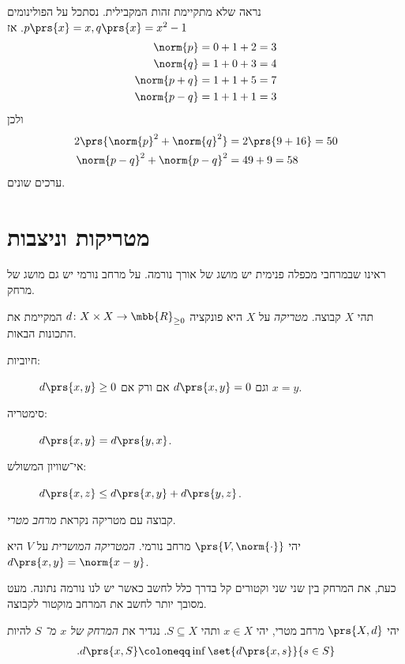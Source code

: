 \documentclass[a4paper,10pt,twoside,openany]{book}
\begin{document}
\begin{solution}
נראה שלא מתקיימת זהות המקבילית.
נסתכל על הפולינומים
$p\prs{x} = x, q\prs{x} = x^2 - 1$.
אז
\begin{align*}
\norm{p} &= 0+1+2 = 3 \\
\norm{q} &= 1 + 0 + 3 = 4 \\
\norm{p+q} &= 1 + 1 + 5 = 7 \\
\norm{p-q} &= 1 + 1 + 1 = 3
\end{align*}
ולכן
\begin{align*}
2 \prs{\norm{p}^2 + \norm{q}^2} &= 2 \prs{9 + 16} = 50 \\
\norm{p-q}^2 + \norm{p-q}^2 &= 49 + 9 = 58
\end{align*}
ערכים שונים.
\end{solution}

\section{מטריקות וניצבות}

ראינו שבמרחבי מכפלה פנימית יש מושג של אורך%
\textemdash
נורמה.
על מרחב נורמי יש גם מושג של מרחק.

\begin{definition}[מטריקה]
תהי
$X$
קבוצה.
\emph{מטריקה}
על
$X$
היא פונקציה
$d \colon X \times X \to \mbb{R}_{\geq 0}$
המקיימת את התכונות הבאות.
\begin{description}
\item[חיוביות:]
$d\prs{x,y} \geq 0$
וגם
$d\prs{x,y} = 0$
אם ורק אם
$x = y$.

\item[סימטריה:]
$d\prs{x,y} = d\prs{y,x}$.

\item[אי־שוויון המשולש:]
$d\prs{x,z} \leq d\prs{x,y} + d\prs{y,z}$.
\end{description}

קבוצה עם מטריקה נקראת
\emph{מרחב מטרי}.
\end{definition}

\begin{definition}
יהי
$\prs{V,\norm{\cdot}}$
מרחב נורמי.
\emph{המטריקה המושרית}
על
$V$
היא
$d\prs{x,y} = \norm{x-y}$.
\end{definition}

כעת, את המרחק בין שני שני וקטורים קל בדרך כלל לחשב כאשר יש לנו נורמה נתונה. מעט מסובך יותר לחשב את המרחב מוקטור לקבוצה.

\begin{definition}
יהי
$\prs{X,d}$
מרחב מטרי, יהי
$x \in X$
ותהי
$S \subseteq X$.
נגדיר את
\emph{המרחק של
$x$
מ־%
$S$}
להיות
\begin{align*}
\text{.} d\prs{x,S} \coloneqq \inf\set{d\prs{x,s}}{s \in S}
\end{align*}
\end{definition}
\end{document}
